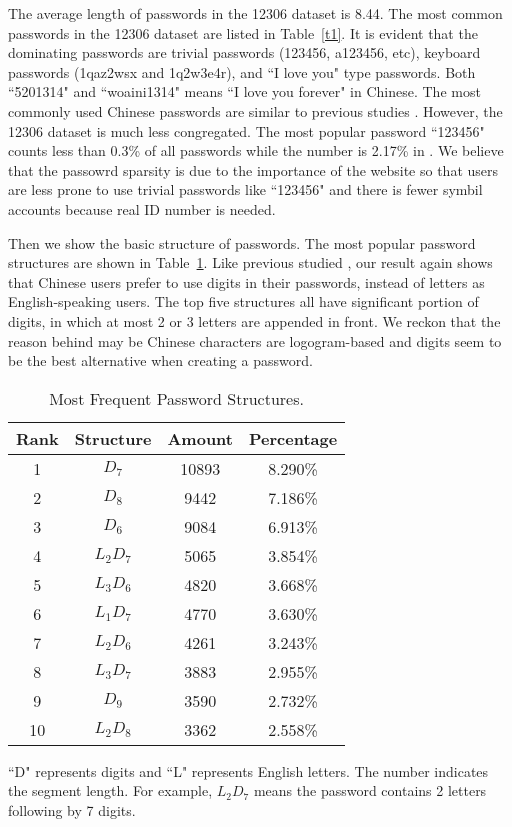 The average length of passwords in  the 12306 dataset is 8.44. The most common passwords in the 12306 dataset are listed in Table~\ref{t1}.
It is evident that the dominating passwords are trivial passwords (123456, a123456, etc), keyboard passwords (1qaz2wsx and 1q2w3e4r), and ``I love you" type passwords. Both ``5201314" and ``woaini1314" means ``I love you forever" in Chinese. The most commonly used Chinese passwords are similar to previous studies \cite{li2014large}. However, the 12306 dataset is much less congregated. The most popular password ``123456" counts less than 0.3\% of all passwords while the number is 2.17\% in \cite{li2014large}. We believe that the passowrd sparsity is due to the importance of the website so that users are less prone to use trivial passwords like ``123456" and there is fewer symbil accounts because real ID number is needed. 

Then we show the basic structure of passwords. The most popular password structures are shown in Table~\ref{t2}. Like previous studied \cite{li2014large}, our result again shows that Chinese users prefer to use digits in their passwords, instead of letters as English-speaking users. The top five structures all have significant portion of digits, in which at most 2 or 3 letters are appended in front. We reckon that the reason behind may be Chinese characters are logogram-based  and digits seem to be the best alternative when creating a password.

\begin{table}
\centering
\caption{Most Frequent Password Structures.}
\begin{tabular}{|c|c|c|c|} \hline
Rank&Structure&Amount&Percentage\\ \hline
1&$D_7$&10893&8.290\%\\ 
2&$D_8$&9442&7.186\%\\ 
3&$D_6$&9084&6.913\%\\ 
4&$L_2D_7$&5065&3.854\%\\ 
5&$L_3D_6$&4820&3.668\%\\ 
6&$L_1D_7$&4770&3.630\%\\ 
7&$L_2D_6$&4261&3.243\%\\ 
8&$L_3D_7$&3883&2.955\%\\ 
9&$D_9$&3590&2.732\%\\ 
10&$L_2D_8$&3362&2.558\%\\ 
\hline\end{tabular}
\label{t2}
\begin{tablenotes}
      \small
      \item ``D" represents digits and ``L" represents English letters. The number indicates the segment length. For example, $L_2D_7$ means the password contains 2 letters following by 7 digits.
    \end{tablenotes}
\end{table}

